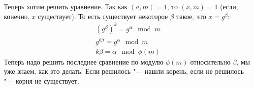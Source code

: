 Теперь хотим решить уравнение.
Так как $(a, m)=1$, то $(x, m)=1$ (если, конечно, $x$ существует).
То есть существует некоторое $\beta$ такое, что $x=g^{\beta}$:
\begin{gather*}
(g^{\beta})^k = g^{\alpha} \mod m \\
g^{k\beta} = g^{\alpha} \mod m \\
k\beta = \alpha \mod \phi (m)
\end{gather*}
Теперь надо решить последнее сравнение по модулю $\phi(m)$ относительно $\beta$, мы уже знаем, как это делать.
Если решилось "--- нашли корень, если не решилось "--- корня не существует.
